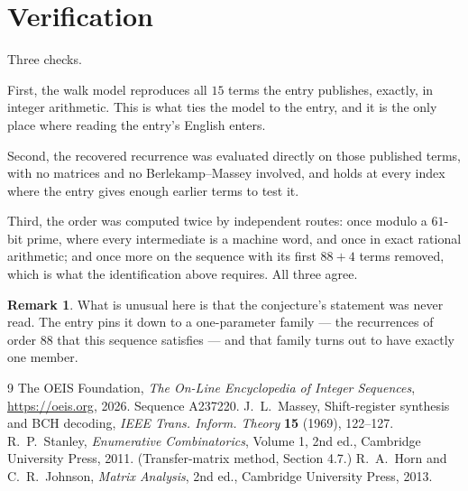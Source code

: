 \documentclass[11pt,a4paper]{article}
\theoremstyle{plain}
\theoremstyle{definition}
\newtheorem{remark}[theorem]{Remark}
\begin{document}
\section{Verification}

Three checks.

First, the walk model reproduces all $15$ terms the entry publishes, exactly, in integer
arithmetic. This is what ties the model to the entry, and it is the only place where reading
the entry's English enters.

Second, the recovered recurrence was evaluated directly on those published terms, with no
matrices and no Berlekamp--Massey involved, and holds at every index where the entry gives
enough earlier terms to test it.

Third, the order was computed twice by independent routes: once modulo a $61$-bit prime, where
every intermediate is a machine word, and once in exact rational arithmetic; and once more on
the sequence with its first $88+4$ terms removed, which is what the identification above
requires. All three agree.

\begin{remark}
What is unusual here is that the conjecture's statement was never read. The entry pins it down
to a one-parameter family --- the recurrences of order $88$ that this sequence satisfies
--- and that family turns out to have exactly one member.
\end{remark}

\begin{thebibliography}{9}
 The OEIS Foundation, \emph{The On-Line Encyclopedia of Integer
Sequences}, \url{https://oeis.org}, 2026. Sequence A237220.
 J.~L.~Massey, Shift-register synthesis and BCH decoding, \emph{IEEE
Trans. Inform. Theory} \textbf{15} (1969), 122--127.
 R.~P.~Stanley, \emph{Enumerative Combinatorics}, Volume 1, 2nd ed.,
Cambridge University Press, 2011. (Transfer-matrix method, Section 4.7.)
 R.~A.~Horn and C.~R.~Johnson, \emph{Matrix Analysis}, 2nd ed., Cambridge
University Press, 2013.
\end{thebibliography}
\end{document}
